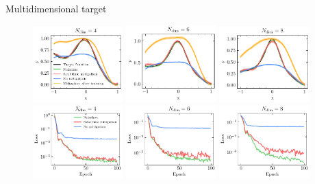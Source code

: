 \documentclass[8pt, xcolor={svgnames}, hyperref={linkcolor=black}]{beamer}
\begin{document}
\begin{frame}{Multidimensional target}
\begin{figure}
    \includegraphics[width=0.31\textwidth]{figures/cos4d.pdf}%
    \includegraphics[width=0.31\textwidth]{figures/cos6d.pdf}%
    \includegraphics[width=0.31\textwidth]{figures/cos8d.pdf}
    \includegraphics[width=0.31\textwidth]{figures/cos4d_loss.pdf}%
    \includegraphics[width=0.31\textwidth]{figures/cos6d_loss.pdf}%
    \includegraphics[width=0.31\textwidth]{figures/cos8d_loss.pdf}
\end{figure}
\end{frame}
\end{document}

